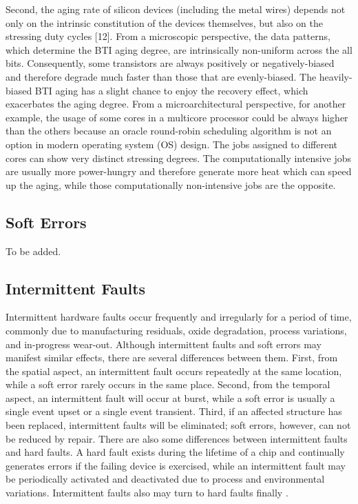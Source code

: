 Second, the aging rate of silicon devices (including the metal wires) depends not only on the intrinsic constitution of the devices themselves, but also on the stressing duty cycles [12]. From a microscopic perspective, the data patterns, which determine the BTI aging degree, are intrinsically non-uniform across the all bits. Consequently, some transistors are always positively or negatively-biased and therefore degrade much faster than those that are evenly-biased. The heavily-biased BTI aging has a slight chance to enjoy the recovery effect, which exacerbates the aging degree. From a microarchitectural perspective, for another example, the usage of some cores in a multicore processor could be always higher than the others because an oracle round-robin scheduling algorithm is not an option in modern operating system (OS) design. The jobs assigned to different cores can show very distinct stressing degrees. The computationally intensive jobs are usually more power-hungry and therefore generate more heat which can speed up the aging, while those computationally non-intensive jobs are the opposite.

\subsection{Soft Errors}
To be added.

\subsection{Intermittent Faults}
Intermittent hardware faults occur frequently and irregularly for a period of time, commonly due to manufacturing residuals, oxide degradation, process variations, and in-progress wear-out. Although intermittent faults and soft errors may manifest similar effects, there are several differences between them. First, from the spatial aspect, an intermittent fault occurs repeatedly at the same location, while a soft error rarely occurs in the same place. Second, from the temporal aspect, an intermittent fault will occur at burst, while a soft error is usually a single event upset or a single event transient. Third, if an affected structure has been replaced, intermittent faults will be eliminated; soft errors, however, can not be reduced by repair. There are also some differences between intermittent faults and hard faults. A hard fault exists during the lifetime of a chip and continually generates errors if the failing device is exercised, while an intermittent fault may be periodically activated and deactivated due to process and environmental variations. Intermittent faults also may turn to hard faults finally \cite{smolens2007detecting}.


